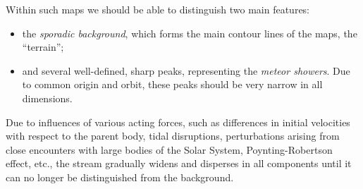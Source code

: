         Within such maps we should be able to distinguish two main features:
        \begin{itemize}
            \item the \emph{sporadic background}, which forms the main contour lines of the maps, the ``terrain'';
            \item and several well-defined, sharp peaks, representing the \emph{meteor showers}.
                Due to common origin and orbit, these peaks should be very narrow in all dimensions.
        \end{itemize}

            Due to influences of various acting forces, such as differences
            in initial velocities with respect to the parent body, tidal disruptions,
            perturbations arising from close encounters with large bodies of the Solar System,
            Poynting-Robertson effect, etc., the stream
            gradually widens and disperses in all components until it can no longer be distinguished from the background.


